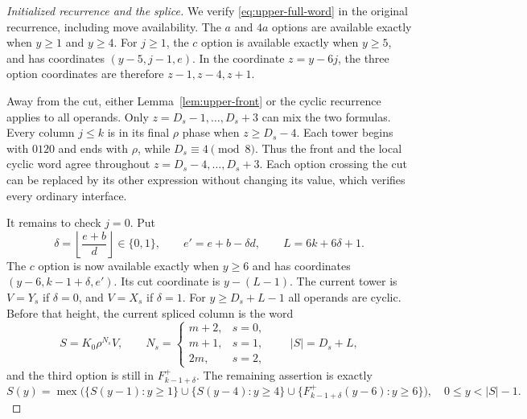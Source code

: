 \documentclass[11pt]{article}
\theoremstyle{remark}\newtheorem{remark}[theorem]{Remark}
\DeclareMathOperator{\mex}{mex}
\begin{document}
\begin{proof}[Initialized recurrence and the splice]
We verify \eqref{eq:upper-full-word} in the original recurrence,
including move availability.  The $a$ and $4a$ options are available
exactly when $y\ge1$ and $y\ge4$.  For $j\ge1$, the $c$ option is
available exactly when $y\ge5$, and has coordinates $(y-5,j-1,e)$.
In the coordinate $z=y-6j$, the three option coordinates are therefore
$z-1,z-4,z+1$.

Away from the cut, either Lemma~\ref{lem:upper-front} or the cyclic
recurrence applies to all operands.  Only $z=D_s-1,\ldots,D_s+3$ can
mix the two formulas.  Every column $j\le k$ is in its final $\rho$
phase when $z\ge D_s-4$.  Each tower begins with $0120$ and ends with
$\rho$, while $D_s\equiv4\pmod8$.  Thus the front and the local cyclic
word agree throughout $z=D_s-4,\ldots,D_s+3$.  Each option crossing the
cut can be replaced by its other expression without changing its
value, which verifies every ordinary interface.

It remains to check $j=0$.  Put
\[
 \delta=\left\lfloor\frac{e+b}{d}\right\rfloor\in\{0,1\},
 \qquad e'=e+b-\delta d,\qquad L=6k+6\delta+1.
\]
The $c$ option is now available exactly when $y\ge6$ and has
coordinates $(y-6,k-1+\delta,e')$.  Its cut coordinate is $y-(L-1)$.
The current tower is $V=Y_s$ if $\delta=0$, and $V=X_s$ if $\delta=1$.
For $y\ge D_s+L-1$ all operands are cyclic.  Before that height,
the current spliced column is the word
\[
 S=K_0\rho^{N_s}V,
 \qquad N_s=
 \begin{cases}m+2,&s=0,\\m+1,&s=1,\\2m,&s=2,\end{cases}
 \qquad |S|=D_s+L,
\]
and the third option is still in $F^+_{k-1+\delta}$.  The remaining
assertion is exactly
\begin{equation}\label{eq:upper-boundary-certificate}
 S(y)=\mex\bigl(
 \{S(y-1):y\ge1\}\cup\{S(y-4):y\ge4\}
 \cup\{F^+_{k-1+\delta}(y-6):y\ge6\}\bigr),
 \quad 0\le y<|S|-1.
\end{equation}


\end{proof}
\end{document}

